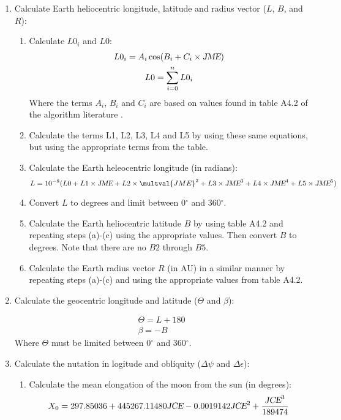 {\begin{enumerate}
\item Calculate Earth heliocentric longitude, latitude and radius vector ($L$, $B$, and $R$):
  \begin{enumerate}
    \item Calculate $L0_i$ and $L0$:
    \begin{gather*}
    L0_i = A_i \cos(B_i + C_i \times \text{\sl JME}) \\
    L0 = \sum \limits_{i=0}^n L0_i
    \end{gather*}
%
    Where the terms $A_i$, $B_i$ and $C_i$ are based on values found in table A4.2 of the algorithm
    literature \cite{Reda}.

    \item Calculate the terms L1, L2, L3, L4 and L5 by using these same equations, but using the
    appropriate terms from the table.

    \item Calculate the Earth heleocentric longitude (in radians):
    \begin{displaymath}
    L = 10^{-8} (L0 + L1 \times \multvar{JME} + L2 \times \multval{JME}^2 + L3 \times \multvar{JME}^3 + L4 \times \multvar{JME}^4 + L5 \times \multvar{JME}^5)
    \end{displaymath}

    \item Convert $L$ to degrees and limit between 0$^\circ$ and 360$^\circ$.

    \item Calculate the Earth heliocentric latitude $B$ by using table A4.2 and repeating
    steps (a)-(c) using the appropriate values. Then convert $B$ to degrees. Note that there are no $B2$ through $B5$.

    \item Calculate the Earth radius vector $R$ (in AU) in a similar manner by repeating steps (a)-(c)
    and using the appropriate values from table A4.2.

  \end{enumerate}
  
\item Calculate the geocentric longitude and latitude ($\Theta$ and $\beta$):

\begin{gather*}
\Theta = L + 180 \\
\beta = - B 
\end{gather*}
%
Where $\Theta$ must be limited between 0$^\circ$ and 360$^\circ$.

\item Calculate the nutation in logitude and obliquity ($\Delta \psi$ and $\Delta \epsilon$):
  \begin{enumerate}
  \item Calculate the mean elongation of the moon from the sun (in degrees):
      \begin{displaymath}
      X_0 = 297.85036 + 445267.11480 \text{\sl JCE} - 0.0019142 \text{\sl JCE}^2 + \frac{\text{\sl JCE}^3}{189474}
      \end{displaymath}


\end{enumerate}
\end{enumerate}}
